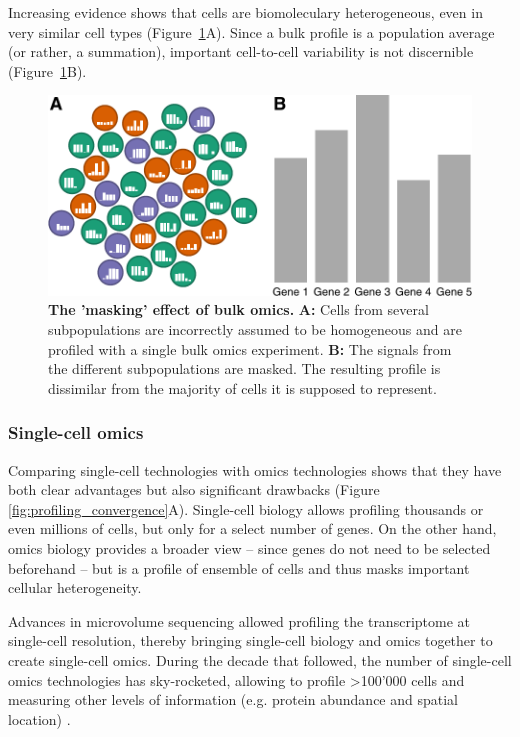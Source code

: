 Increasing evidence shows that cells are biomoleculary heterogeneous, even in very similar cell types \cite{hwang_singlecellrnasequencing_2018} (Figure~\ref{fig:bulk_vs_sc}A). Since a bulk profile is a population average (or rather, a summation), important cell-to-cell variability is not discernible (Figure~\ref{fig:bulk_vs_sc}B). 

\begin{figure}[htb!]
	\centering
	\includegraphics[width=\LARgefigure]{fig/bulk_vs_sc} 
	\caption{
		\textbf{The 'masking' effect of bulk omics.} 
		\textbf{A:} Cells from several subpopulations are incorrectly assumed to be homogeneous and are profiled with a single bulk omics experiment.
		\textbf{B:} The signals from the different subpopulations are masked. The resulting profile is dissimilar from the majority of cells it is supposed to represent.
	}
	\label{fig:bulk_vs_sc}
\end{figure}

\subsubsection{Single-cell omics}
Comparing single-cell technologies with omics technologies shows that they have both clear advantages but also significant drawbacks (Figure \ref{fig:profiling_convergence}A). Single-cell biology allows profiling thousands or even millions of cells, but only for a select number of genes. On the other hand, omics biology provides a broader view -- since genes do not need to be selected beforehand -- but is a profile of ensemble of cells and thus masks important cellular heterogeneity.

Advances in microvolume sequencing allowed profiling the transcriptome at single-cell resolution, thereby bringing single-cell biology and omics together to create single-cell omics. During the decade that followed, the number of single-cell omics technologies has sky-rocketed, allowing to profile >100'000 cells \cite{svensson_exponentialscalingsinglecell_2018} and measuring other levels of information (e.g. protein abundance and spatial location) \cite{moudgil_multimodalscrnaseq_2019}.

